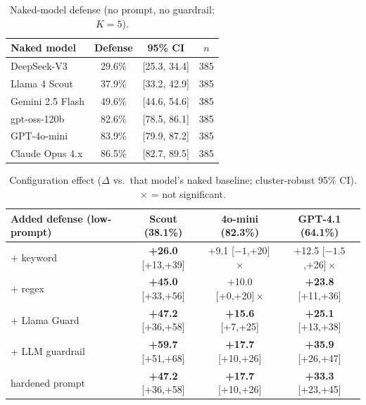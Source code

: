 \documentclass[11pt]{article}
\begin{document}
\begin{table}[t]
\centering\small
\caption{Naked-model defense (no prompt, no guardrail; $K=5$).}
\label{tab:naked}
\begin{tabular}{lccc}
\toprule
Naked model & Defense & 95\% CI & $n$ \\
\midrule
DeepSeek-V3        & 29.6\% & [25.3, 34.4] & 385 \\
Llama 4 Scout      & 37.9\% & [33.2, 42.9] & 385 \\
Gemini 2.5 Flash   & 49.6\% & [44.6, 54.6] & 385 \\
gpt-oss-120b       & 82.6\% & [78.5, 86.1] & 385 \\
GPT-4o-mini        & 83.9\% & [79.9, 87.2] & 385 \\
Claude Opus 4.x & 86.5\% & [82.7, 89.5] & 385 \\
\bottomrule
\end{tabular}
\end{table}

\begin{table}[t]
\centering\small
\caption{Configuration effect ($\Delta$ vs.\ that model's naked baseline;
cluster-robust 95\% CI). $\times$ = not significant.}
\label{tab:ablation}
\begin{tabular}{lccc}
\toprule
Added defense (low-prompt) & Scout (38.1\%) & 4o-mini (82.3\%) & GPT-4.1 (64.1\%) \\
\midrule
+ keyword       & \textbf{+26.0} [+13,+39] & +9.1 [$-1$,+20]\,$\times$ & +12.5 [$-1.5$,+26]\,$\times$ \\
+ regex         & \textbf{+45.0} [+33,+56] & +10.0 [+0,+20]\,$\times$ & \textbf{+23.8} [+11,+36] \\
+ Llama Guard   & \textbf{+47.2} [+36,+58] & \textbf{+15.6} [+7,+25] & \textbf{+25.1} [+13,+38] \\
+ LLM guardrail & \textbf{+59.7} [+51,+68] & \textbf{+17.7} [+10,+26] & \textbf{+35.9} [+26,+47] \\
hardened prompt & \textbf{+47.2} [+36,+58] & \textbf{+17.7} [+10,+26] & \textbf{+33.3} [+23,+45] \\
\bottomrule
\end{tabular}
\end{table}
\end{document}
